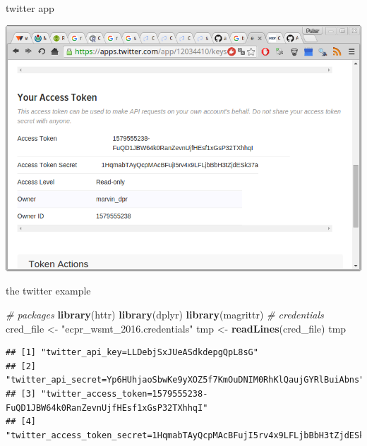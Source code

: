 \documentclass[ignorenonframetext,]{beamer}
\newenvironment{Shaded}{\begin{snugshade}}{\end{snugshade}}
\newcommand{\KeywordTok}[1]{\textcolor[rgb]{0.13,0.29,0.53}{\textbf{{#1}}}}
\newcommand{\StringTok}[1]{\textcolor[rgb]{0.31,0.60,0.02}{{#1}}}
\newcommand{\CommentTok}[1]{\textcolor[rgb]{0.56,0.35,0.01}{\textit{{#1}}}}
\newcommand{\NormalTok}[1]{{#1}}
\begin{document}
\begin{frame}{twitter app}

\includegraphics{fig/twitterapp7.png}

\end{frame}

\begin{frame}[fragile]{the twitter example}

\begin{Shaded}
\begin{Highlighting}[]
\CommentTok{# packages}
\KeywordTok{library}\NormalTok{(httr)}
\KeywordTok{library}\NormalTok{(dplyr)}
\KeywordTok{library}\NormalTok{(magrittr)}
\CommentTok{# credentials}
\NormalTok{cred_file <-}\StringTok{ "ecpr_wsmt_2016.credentials"}
\NormalTok{tmp       <-}\StringTok{ }\KeywordTok{readLines}\NormalTok{(cred_file)}
\NormalTok{tmp}
\end{Highlighting}
\end{Shaded}

\begin{verbatim}
## [1] "twitter_api_key=LLDebjSxJUeASdkdepgQpL8sG"                                
## [2] "twitter_api_secret=Yp6HUhjaoSbwKe9yXOZ5f7KmOuDNIM0RhKlQaujGYRlBuiAbns"    
## [3] "twitter_access_token=1579555238-FuQD1JBW64k0RanZevnUjfHEsf1xGsP32TXhhqI"  
## [4] "twitter_access_token_secret=1HqmabTAyQcpMAcBFujI5rv4x9LFLjbBbH3tZjdESk37a"
\end{verbatim}

\end{frame}
\end{document}
